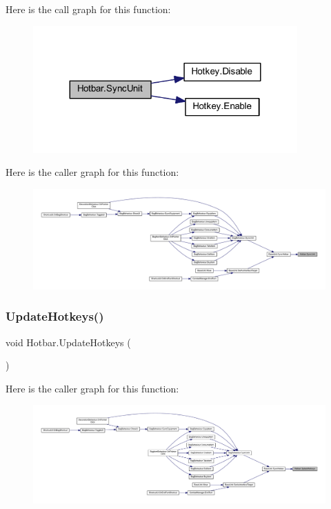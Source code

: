Here is the call graph for this function\+:
\nopagebreak
\begin{figure}[H]
\begin{center}
\leavevmode
\includegraphics[width=287pt]{class_hotbar_a1e796a0a133ee0743aa8585c05980f9b_cgraph}
\end{center}
\end{figure}
Here is the caller graph for this function\+:
\nopagebreak
\begin{figure}[H]
\begin{center}
\leavevmode
\includegraphics[width=350pt]{class_hotbar_a1e796a0a133ee0743aa8585c05980f9b_icgraph}
\end{center}
\end{figure}
\mbox{\label{class_hotbar_a1b1cab633f4bf2347af2c0f04fa4b856}} 
\subsubsection{\texorpdfstring{UpdateHotkeys()}{UpdateHotkeys()}}
{\footnotesize\ttfamily void Hotbar.\+Update\+Hotkeys (\begin{DoxyParamCaption}{ }\end{DoxyParamCaption})}

Here is the caller graph for this function\+:
\nopagebreak
\begin{figure}[H]
\begin{center}
\leavevmode
\includegraphics[width=350pt]{class_hotbar_a1b1cab633f4bf2347af2c0f04fa4b856_icgraph}
\end{center}
\end{figure}


